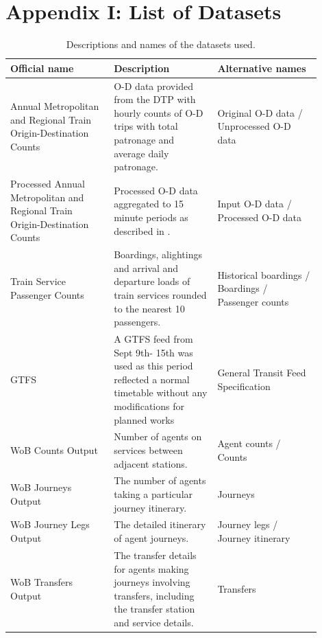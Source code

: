 \chapter{Appendix I: List of Datasets}
\label{chap:datasets_app}
\setcounter{table}{0}
\renewcommand{\thetable}{A\arabic{table}}

\begin{table}[ht]
\caption{Descriptions and names of the datasets used.}
    \centering
    \begin{tabular}{>{\raggedright\arraybackslash}p{0.3\linewidth} | >{\raggedright\arraybackslash}p{0.3\linewidth} | >{\raggedright\arraybackslash}p{0.3\linewidth}} 
        \toprule
        Official name              & Description            & Alternative names  \\
        \midrule
        Annual Metropolitan and Regional Train Origin-Destination Counts  & O-D data provided from the DTP with hourly counts of O-D trips with total patronage and average daily patronage.  &  
        Original O-D data /
        Unprocessed O-D data \\ \hline
        Processed Annual Metropolitan and Regional Train Origin-Destination Counts          & Processed O-D data aggregated to 15 minute periods as described in {subsec:data_recon}.&  
        Input O-D data /
        Processed O-D data
          \\ \hline
        Train Service Passenger Counts   & Boardings, alightings and arrival and departure loads of train services rounded to the nearest 10 passengers. & 
        Historical boardings / 
        Boardings /
        Passenger counts
        \\ 
        \bottomrule
 GTFS& A GTFS feed from Sept 9th- 15th was used as this period reflected a normal timetable without any modifications for planned works & General Transit Feed Specification\\ \hline
 WoB Counts Output& Number of agents on services between adjacent stations. &Agent counts / Counts\\ \hline
 WoB Journeys Output& The number of agents taking a particular journey itinerary. &Journeys\\ \hline
 WoB Journey Legs Output& The detailed itinerary of agent journeys. &Journey legs / Journey itinerary\\ \hline
 WoB Transfers Output & The transfer details for agents making journeys involving transfers, including the transfer station and service details. & Transfers\\
    \end{tabular}
    \label{tab:datasets}
\end{table}

